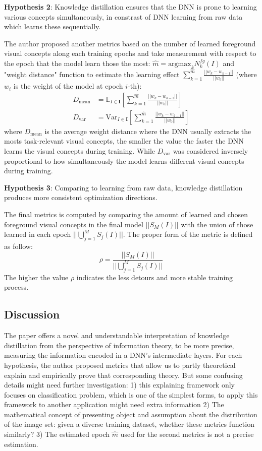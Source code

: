 \textbf{Hypothesis 2}: Knowledge distillation ensures that the DNN is prone to learning various concepts simultaneously, in constrast of DNN learning from raw data which learns these sequentially.

The author proposed another metrics based on the number of learned foreground visual concepts along each training epochs and take measurement with respect to the epoch that the model learn those the most: $\hat{m} = \text{argmax}_k N_{k}^{fg}(I)$ and "weight distance" function to estimate the learning effect $\displaystyle \sum_{k=1}^{\hat{m}} \frac{||w_k - w_{k-1}||}{||w_0||}$ (where $w_i$ is the weight of the model at epoch $i$-th):
\begin{align*}
  D_{\text{mean}} &= \mathbb{E}_{I \in \textbf{I}} \left[\displaystyle \sum_{k=1}^{\hat{m}} \frac{||w_k - w_{k-1}||}{||w_0||} \right] \\ 
  D_{\text{var}} &= \text{Var}_{I \in \textbf{I}} \left[\displaystyle \sum_{k=1}^{\hat{m}} \frac{||w_k - w_{k-1}||}{||w_0||}\right] 
\end{align*}
where $D_{\text{mean}}$ is the average weight distance where the DNN usually extracts the mosts task-relevant visual concepts, the smaller the value the faster the DNN learns the visual concepts during training. While $D_{\text{var}}$ was considered inversely proportional to how simultaneously the model learns different visual concepts during training.

\textbf{Hypothesis 3}: Comparing to learning from raw data, knowledge distillation produces more consistent optimization directions. 

The final metrics is computed by comparing the amount of learned and chosen foreground visual concepts in the final model $||S_M(I)||$ with the union of those learned in each epoch $||\bigcup_{j=1}^MS_j(I)||$. The proper form of the metric is defined as follow:
\[
  \rho = \frac{||S_M(I)||}{||\bigcup_{j=1}^MS_j(I)||}
\]
The higher the value $\rho$ indicates the less detours and more stable training process.

\subsection{Discussion}
The paper offers a novel and understandable interpretation of knowledge distillation from the perspective of information theory, to be more precise, measuring the information encoded in a DNN's intermediate layers. For each hypothesis, the author proposed metrics that allow us to partly theoretical explain and empirically prove that corresponding theory. But some confusing details might need further investigation: 1) this explaining framework only focuses on classification problem, which is one of the simplest forms, to apply this framework to another application might need extra information 2) The mathematical concept of presenting object and assumption about the distribution of the image set: given a diverse training dataset, whether these metrics function similarly? 3) The estimated epoch $\hat{m}$ used for the second metrics is not a precise estimation.
